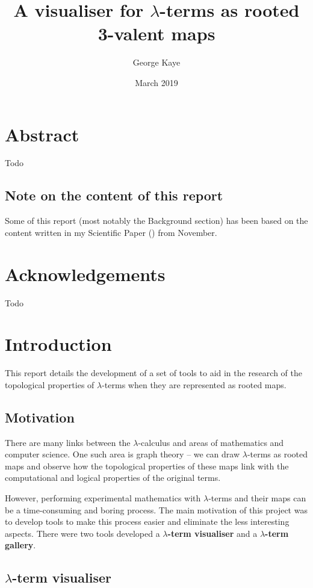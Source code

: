 \documentclass[11pt]{article}
\title{A visualiser for $\lambda$-terms as rooted 3-valent maps}
\author{George Kaye}
\date{March 2019}
\begin{document}


\tableofcontents

\newpage

\section{Abstract}
\label{sec:abstract}
Todo


\subsection*{Note on the content of this report}
Some of this report (most notably the Background section) has been based on the content written in my Scientific Paper (\cite{scientificpaper}) from November.

\newpage

\section{Acknowledgements}
\label{sec:acks}
Todo


\newpage

\section{Introduction}
\label{sec:intro}

This report details the development of a set of tools to aid in the research of the topological properties of $\lambda$-terms when they are represented as rooted maps.

\subsection{Motivation}
There are many links between the $\lambda$-calculus and areas of mathematics and computer science. One such area is graph theory -- we can draw $\lambda$-terms as rooted maps and observe how the topological properties of these maps link with the computational and logical properties of the original terms.

However, performing experimental mathematics with $\lambda$-terms and their maps can be a time-consuming and boring process. The main motivation of this project was to develop tools to make this process easier and eliminate the less interesting aspects. There were two tools developed a \textbf{$\lambda$-term visualiser} and a \textbf{$\lambda$-term gallery}.

\subsection{\texorpdfstring{$\lambda$}{lambda}-term visualiser}
\end{document}

